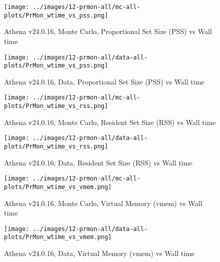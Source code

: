 


\begin{figure}[ht]
    \centering
        \centering
        \texttt{[image: ../images/12-prmon-all/mc-all-plots/PrMon\_wtime\_vs\_pss.png]}
        \caption{ Athena v24.0.16, Monte Carlo, Proportional Set Size (PSS) vs Wall time}
        \label{fig: mc-prmon-pss}
\end{figure}
\begin{figure}[ht]
    \centering
        \centering
        \texttt{[image: ../images/12-prmon-all/data-all-plots/PrMon\_wtime\_vs\_pss.png]}
        \caption{ Athena v24.0.16, Data, Proportional Set Size (PSS) vs Wall time}
        \label{fig: data-prmon-pss}
\end{figure}


\begin{figure}[ht]
        \centering
        \texttt{[image: ../images/12-prmon-all/mc-all-plots/PrMon\_wtime\_vs\_rss.png]}
        \caption{ Athena v24.0.16,  Monte Carlo, Resident Set Size (RSS) vs Wall time}
        \label{fig: mc-prmon-rss}
\end{figure}
\begin{figure}[ht]
    \centering
    \texttt{[image: ../images/12-prmon-all/data-all-plots/PrMon\_wtime\_vs\_rss.png]}
    \caption{ Athena v24.0.16,  Data, Resident Set Size (RSS) vs Wall time}
    \label{fig: data-prmon-rss}
\end{figure}

\begin{figure}[ht]
        \centering
        \texttt{[image: ../images/12-prmon-all/mc-all-plots/PrMon\_wtime\_vs\_vmem.png]}
        \caption{ Athena v24.0.16,  Monte Carlo, Virtual Memory (vmem) vs Wall time}
        \label{fig: mc-prmon-vmem}
\end{figure}
\begin{figure}[ht]
    \centering
    \texttt{[image: ../images/12-prmon-all/data-all-plots/PrMon\_wtime\_vs\_vmem.png]}
    \caption{ Athena v24.0.16,  Data, Virtual Memory (vmem) vs Wall time}
    \label{fig: data-prmon-vmem}
\end{figure}

